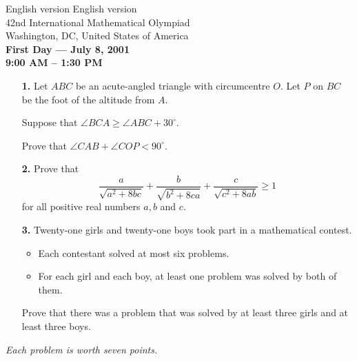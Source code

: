 \documentclass[12pt]{article}
\begin{document}
\pagestyle{empty}


\begin{center}
{ English version \hfill English version } \\
\bigskip
{\Large 42nd International Mathematical Olympiad} \\
{\large Washington, DC, United States of America} \\
\medskip
{\large
\textbf{First Day --- July 8, 2001} \\
\textbf{9:00 AM -- 1:30 PM}\\
}
\end{center}


\vspace{0.5in}

\begin{enumerate}
\item[\textbf{1.}] Let $ABC$ be an acute-angled triangle with
circumcentre $O$. Let $P$ on $BC$ be the foot of the altitude from
$A$.

\smallskip
Suppose that $\angle BCA \geq \angle ABC + 30^{\circ}$.

\smallskip
Prove that $\angle CAB + \angle COP < 90^{\circ}.$

\vspace{0.5in}

\item[\textbf{2.}] Prove that
\[
\frac{a}{\sqrt{a^2+8bc}} + \frac{b}{\sqrt{b^2+8ca}} + \frac{c}{\sqrt{c^2+8ab}}
\geq 1
\]
for all positive real numbers $a, b$ and $c$.

\vspace{0.5in}

\item[\textbf{3.}] Twenty-one girls and twenty-one boys
took part in a mathematical contest.
\begin{itemize}
\item
Each contestant solved at most six problems.
\item
For each girl and each boy, at least one problem was solved by both of them.
\end{itemize}
Prove that there was a problem that was solved by at least three
girls and at least three boys.
\end{enumerate}

\vspace{1in} \noindent \textit{Each problem is worth seven
points.}

 \pagebreak
\end{document}
